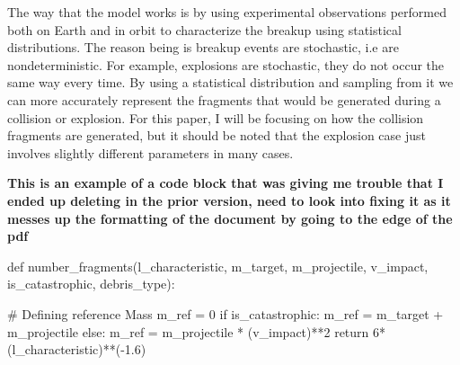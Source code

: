 \documentclass{article}
\makeatletter
\renewcommand\section{\clearpage\newpage\@startsection {section}{1}{\z@}%
	{-3.5ex \@plus -1ex \@minus -.2ex}%
	{2.3ex \@plus.2ex}%
	{\normalfont\Large\bfseries}}
\makeatother
\begin{document}
The way that the model works is by using experimental observations performed both on Earth and in orbit to characterize the breakup using statistical distributions. The reason being is breakup events are stochastic, i.e are nondeterministic.  For example, explosions are stochastic, they do not occur the same way every time.  By using a statistical distribution and sampling from it we can more accurately represent the fragments that would be generated during a collision or explosion. For this paper, I will be focusing on how the collision fragments are generated, but it should be noted that the explosion case just involves slightly different parameters in many cases.

\newpage
\textbf{This is an example of a code block that was giving me trouble that I ended up deleting in the prior version, need to look into fixing it as it messes up the formatting of the document by going to the edge of the pdf}

\begin{python}
	def number_fragments(l_characteristic, m_target, m_projectile, v_impact, is_catastrophic, debris_type):
	
	# Defining reference Mass
	m_ref = 0
	if is_catastrophic: m_ref = m_target + m_projectile
	else: m_ref = m_projectile * (v_impact)**2
	return 6*(l_characteristic)**(-1.6)
	
\end{python}




%
%
%

\end{document}
